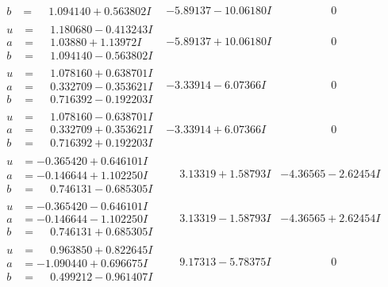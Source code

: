 \documentclass[1p]{elsarticle_modified}
\theoremstyle{definition}
\begin{document}
$$\begin{array}{c|c|c}
\begin{aligned}
b &= \phantom{-}1.094140 + 0.563802 I\end{aligned}
 & -5.89137 - 10.06180 I & \phantom{-0.000000 } 0 \\ \hline\begin{aligned}
u &= \phantom{-}1.180680 - 0.413243 I \\
a &= \phantom{-}1.03880 + 1.13972 I \\
b &= \phantom{-}1.094140 - 0.563802 I\end{aligned}
 & -5.89137 + 10.06180 I & \phantom{-0.000000 } 0 \\ \hline\begin{aligned}
u &= \phantom{-}1.078160 + 0.638701 I \\
a &= \phantom{-}0.332709 - 0.353621 I \\
b &= \phantom{-}0.716392 - 0.192203 I\end{aligned}
 & -3.33914 - 6.07366 I & \phantom{-0.000000 } 0 \\ \hline\begin{aligned}
u &= \phantom{-}1.078160 - 0.638701 I \\
a &= \phantom{-}0.332709 + 0.353621 I \\
b &= \phantom{-}0.716392 + 0.192203 I\end{aligned}
 & -3.33914 + 6.07366 I & \phantom{-0.000000 } 0 \\ \hline\begin{aligned}
u &= -0.365420 + 0.646101 I \\
a &= -0.146644 + 1.102250 I \\
b &= \phantom{-}0.746131 - 0.685305 I\end{aligned}
 & \phantom{-}3.13319 + 1.58793 I & -4.36565 - 2.62454 I \\ \hline\begin{aligned}
u &= -0.365420 - 0.646101 I \\
a &= -0.146644 - 1.102250 I \\
b &= \phantom{-}0.746131 + 0.685305 I\end{aligned}
 & \phantom{-}3.13319 - 1.58793 I & -4.36565 + 2.62454 I \\ \hline\begin{aligned}
u &= \phantom{-}0.963850 + 0.822645 I \\
a &= -1.090440 + 0.696675 I \\
b &= \phantom{-}0.499212 - 0.961407 I\end{aligned}
 & \phantom{-}9.17313 - 5.78375 I & \phantom{-0.000000 } 0 \\ \hline\begin{aligned}

\end{aligned}
\end{array}$$
\end{document}
